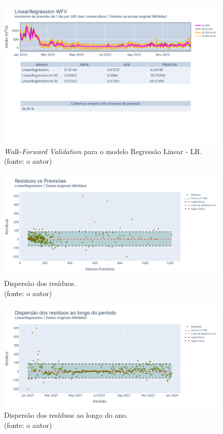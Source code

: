 \begin{figure}[!h]
\centering
\includegraphics[scale=0.33]{Figuras/jequiti/resultados/LR_WFV_SCLD.png}
\caption{\textit{Walk-Forward Validation} para o modelo Regressão Linear - LR.\\(fonte: o autor)}
\label{fig:jequiti_LR_WFV_SCLD}
\end{figure}

\begin{figure}[!h]
\centering
\includegraphics[scale=0.33]{Figuras/jequiti/resultados/LR_WFV_SCLD_RESID_x_PREV.png}
\caption{Dispersão dos resíduos.\\(fonte: o autor)}
\label{fig:jequiti_LR_WFV_SCLD_RESID_x_PREV}
\end{figure}

\begin{figure}[!h]
\centering
\includegraphics[scale=0.33]{Figuras/jequiti/resultados/LR_WFV_SCLD_RESID_x_TEMPO.png}
\caption{Dispersão dos resíduos ao longo do ano.\\(fonte: o autor)}
\label{fig:jequiti_LR_WFV_SCLD_RESID_x_TEMPO}
\end{figure}

